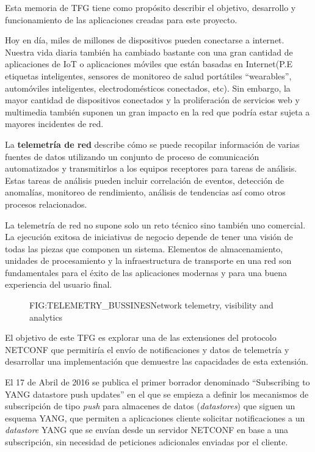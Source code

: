 Esta memoria de \gls{TFG} tiene como propósito describir el objetivo, desarrollo y funcionamiento de las aplicaciones creadas para este proyecto.

Hoy en día, miles de millones de dispositivos pueden conectarse a internet. Nuestra vida diaria también ha cambiado bastante con una gran cantidad de aplicaciones de IoT o aplicaciones móviles que están basadas en Internet(P.E etiquetas inteligentes, sensores de monitoreo de salud portátiles ``wearables'', automóviles inteligentes, electrodomésticos conectados, etc). Sin embargo, la mayor cantidad de dispositivos conectados y la proliferación de servicios web y multimedia también suponen un gran impacto en la red que podría estar sujeta a mayores incidentes de red. 

La \textbf{telemetría de red} describe cómo se puede recopilar información de varias fuentes de datos utilizando un conjunto de proceso de comunicación automatizados y transmitirlos a los equipos receptores para tareas de análisis. Estas tareas de análisis pueden incluir correlación de eventos, detección de anomalías, monitoreo de rendimiento, análisis de tendencias así como otros procesos relacionados. 

La telemetría de red no supone solo un reto técnico sino también uno comercial. La ejecución exitosa de iniciativas de negocio depende de tener una visión de todas las piezas que componen un sistema. Elementos de almacenamiento, unidades de procesamiento y la infraestructura de transporte en una red son fundamentales para el éxito de las aplicaciones modernas y para una buena experiencia del usuario final. 

\begin{figure}[Network telemetry, visibility and analytics]{FIG:TELEMETRY_BUSSINES}{Network telemetry, visibility and analytics}
\end{figure}

El objetivo de este \gls{TFG} es explorar una de las extensiones del protocolo NETCONF que permitiría el envío de notificaciones y datos de telemetría y desarrollar una implementación que demuestre las capacidades de esta extensión.

El 17 de Abril de 2016 se publica el primer borrador denominado  ``Subscribing to YANG datastore push updates'' en el que se empieza a definir los mecanismos de subscripción de tipo \textit{push} para almacenes de datos (\textit{datastores}) que siguen un esquema YANG, que permiten a aplicaciones cliente solicitar notificaciones a un \textit{datastore} YANG que se envían desde un servidor NETCONF en base a una subscripción, sin necesidad de peticiones adicionales enviadas por el cliente\cite{draft-ietf-netconf-yang-push-00}.

